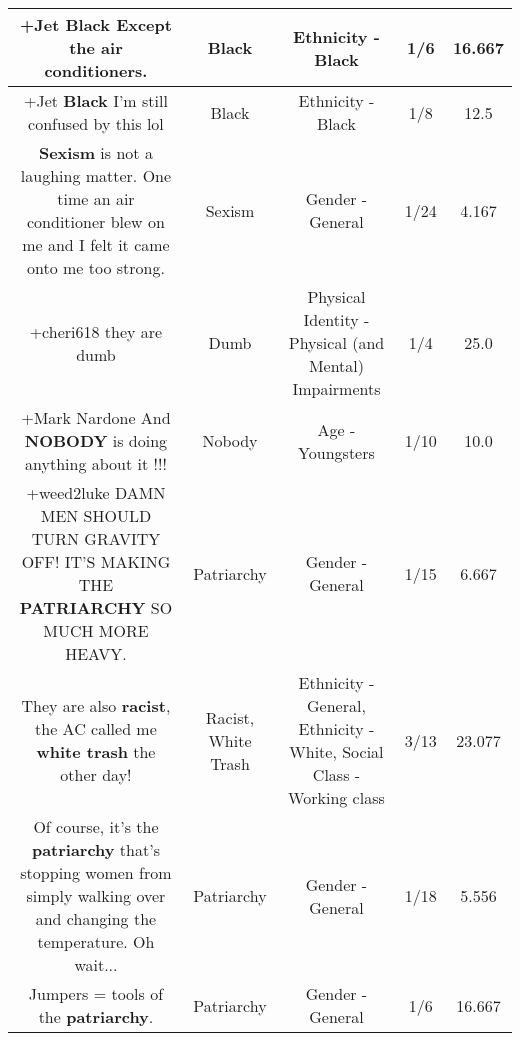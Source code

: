 \documentclass[11pt]{article}
\newlength\mylength
\begin{document}
\begin{center}
\begin{longtable}{|C{.65\mylength}|C{.30\mylength}|C{.12\mylength}|C{.12\mylength}|C{.12\mylength}|}
  \small +Jet \textbf{Black} Except the air conditioners.\normalsize   & Black & Ethnicity - Black & 1/6 & 16.667 \\  \hline
  \small +Jet \textbf{Black} I'm still confused by this lol\normalsize   & Black & Ethnicity - Black & 1/8 & 12.5 \\  \hline
  \small {}\textbf{Sexism} is not a laughing matter. One time an air conditioner blew on me and I felt it came onto me too strong.\normalsize   & Sexism & Gender - General & 1/24 & 4.167 \\  \hline
  \small +cheri618 they are dumb\normalsize   & Dumb & Physical Identity - Physical (and Mental) Impairments & 1/4 & 25.0 \\  \hline
  \small +Mark Nardone And \textbf{NOBODY} is doing anything about it !!!\normalsize   & Nobody & Age - Youngsters & 1/10 & 10.0 \\  \hline
  \small +weed2luke DAMN MEN SHOULD TURN GRAVITY OFF! IT'S MAKING THE \textbf{PATRIARCHY} SO MUCH MORE HEAVY.\normalsize   & Patriarchy & Gender - General & 1/15 & 6.667 \\  \hline
  \small They are also \textbf{racist}, the AC called me \textbf{w\textbf{hite trash}} the other day!\normalsize   & Racist, White Trash & Ethnicity - General, Ethnicity - White, Social Class - Working class & 3/13 & 23.077 \\  \hline
  \small Of course, it's the \textbf{patriarchy} that's stopping women from simply walking over and changing the temperature. Oh wait...\normalsize   & Patriarchy & Gender - General & 1/18 & 5.556 \\  \hline
  \small Jumpers = tools of the \textbf{patriarchy}.\normalsize   & Patriarchy & Gender - General & 1/6 & 16.667 \\  \hline

\end{longtable}
\end{center}
\end{document}
